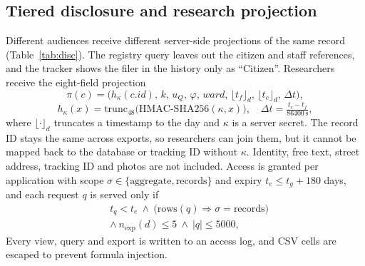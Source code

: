 \documentclass[conference]{IEEEtran}
\begin{document}
\subsection{Tiered disclosure and research projection}\label{sec:priv}
Different audiences receive different server-side projections of the same record (Table~\ref{tab:disc}). The registry query leaves out the citizen and staff references, and the tracker shows the filer in the history only as ``Citizen''. Researchers receive the eight-field projection
\begin{equation}
\pi(c)=\bigl(h_\kappa(c.\mathit{id}),\,k,\,u_Q,\,\varphi,\,\mathit{ward},\,\lfloor t_f\rfloor_{d},\,\lfloor t_c\rfloor_{d},\,\Delta t\bigr),
\label{eq:proj}
\end{equation}
\begin{equation}
h_\kappa(x)=\mathrm{trunc}_{48}\bigl(\mathrm{HMAC\text{-}SHA256}(\kappa,x)\bigr),\quad \Delta t=\tfrac{t_c-t_f}{86400\,\mathrm{s}},
\label{eq:hmac}
\end{equation}
where $\lfloor\cdot\rfloor_d$ truncates a timestamp to the day and $\kappa$ is a server secret. The record ID stays the same across exports, so researchers can join them, but it cannot be mapped back to the database or tracking ID without $\kappa$. Identity, free text, street address, tracking ID and photos are not included. Access is granted per application with scope $\sigma\in\{\text{aggregate},\text{records}\}$ and expiry $t_e\le t_g+180$ days, and each request $q$ is served only if
\begin{equation}
\begin{aligned}
&t_q<t_e\ \wedge\ \bigl(\text{rows}(q)\Rightarrow\sigma=\text{records}\bigr)\\
&\wedge\ n_{\mathrm{exp}}(d)\le5\ \wedge\ |q|\le5000,
\end{aligned}
\label{eq:quota}
\end{equation}
Every view, query and export is written to an access log, and CSV cells are escaped to prevent formula injection.
\end{document}
